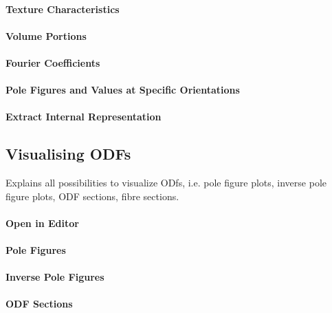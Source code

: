 \documentclass{article}
\begin{document}
			\paragraph{Texture Characteristics}
		
			\paragraph{Volume Portions}
		
			\paragraph{Fourier Coefficients}
		
			\paragraph{Pole Figures and Values at Specific Orientations}
		
			\paragraph{Extract Internal Representation}
		
		\subsection{Visualising ODFs}

		
                     \begin{par}
Explains all possibilities to visualize ODfs, i.e. pole figure plots, inverse pole figure plots, ODF sections, fibre sections.
\end{par} \vspace{1em}

                  
			\paragraph{Open in Editor}
		
			\paragraph{Pole Figures}
		
			\paragraph{Inverse Pole Figures}
		
			\paragraph{ODF Sections}
		
\end{document}
